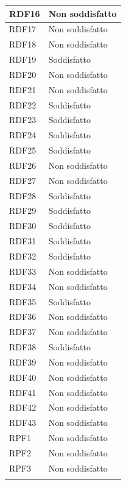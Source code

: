 \begin{longtable}{| p{2.5cm} | p{3cm} |}
	RDF16 & Non soddisfatto \\ \hline
	\rowcolor{LightGray}
	RDF17 & Non soddisfatto \\ \hline
	RDF18 & Non soddisfatto \\ \hline
	\rowcolor{LightGray}
	RDF19 & Soddisfatto \\ \hline
	RDF20 & Non soddisfatto \\ \hline
	\rowcolor{LightGray}
	RDF21 & Non soddisfatto \\ \hline
	RDF22 & Soddisfatto\\ \hline
	\rowcolor{LightGray}
	RDF23 & Soddisfatto \\ \hline
	RDF24 & Soddisfatto \\ \hline
	\rowcolor{LightGray}
	RDF25 & Soddisfatto\\ \hline
	RDF26 & Non soddisfatto\\ \hline
	\rowcolor{LightGray}
	RDF27 & Non soddisfatto\\ \hline
	RDF28 & Soddisfatto \\ \hline
	\rowcolor{LightGray}
	RDF29 & Soddisfatto \\ \hline
	RDF30 & Soddisfatto \\ \hline
	\rowcolor{LightGray}
	RDF31 & Soddisfatto \\ \hline
	RDF32 & Soddisfatto \\ \hline
	\rowcolor{LightGray}
	RDF33 & Non soddisfatto\\ \hline
	RDF34 & Non soddisfatto \\ \hline
	\rowcolor{LightGray}
	RDF35 & Soddisfatto \\ \hline
	RDF36 & Non soddisfatto \\ \hline
	\rowcolor{LightGray}
	RDF37 & Non soddisfatto \\ \hline
	RDF38 & Soddisfatto \\ \hline
	\rowcolor{LightGray}
	RDF39 & Non soddisfatto \\ \hline
	RDF40 & Non soddisfatto \\ \hline
	\rowcolor{LightGray}
	RDF41 & Non soddisfatto \\ \hline
	RDF42 & Non soddisfatto \\ \hline
	\rowcolor{LightGray}
	RDF43 & Non soddisfatto \\ \hline
	RPF1 & Non soddisfatto \\ \hline
	\rowcolor{LightGray}
	RPF2 & Non soddisfatto \\ \hline
	RPF3 & Non soddisfatto \\ \hline
	\rowcolor{LightGray}

\end{longtable}
